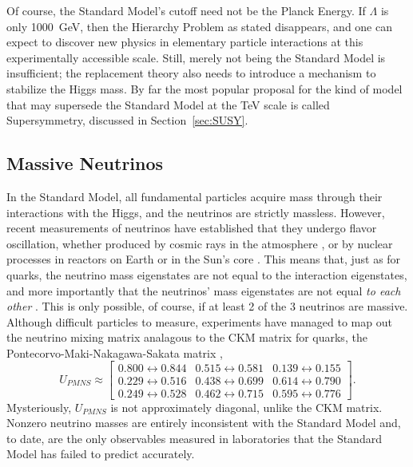   Of course, the Standard Model's cutoff need not be the Planck Energy. 
  If $\Lambda$ is only 1000~GeV, then the Hierarchy Problem as stated disappears, and one can expect to discover new physics in elementary particle interactions at this experimentally accessible scale.
  Still, merely not being the Standard Model is insufficient; the replacement theory also needs to introduce a mechanism to stabilize the Higgs mass.
  By far the most popular proposal for the kind of model that may supersede the Standard Model at the TeV scale is called Supersymmetry, discussed in Section~\ref{sec:SUSY}.

  \subsection{Massive Neutrinos} \label{sec:neutrinomasses}

  In the Standard Model, all fundamental particles acquire mass through their interactions with the Higgs, and the neutrinos are strictly massless.
  However, recent measurements of neutrinos have established that they undergo flavor oscillation, whether produced by cosmic rays in the atmosphere \cite{atmospheric_neutrinos}, or by nuclear processes in reactors on Earth \cite{reactor_neutrinos} or in the Sun's core \cite{solar_neutrinos}.
  This means that, just as for quarks, the neutrino mass eigenstates are not equal to the interaction eigenstates, and more importantly that the neutrinos' mass eigenstates are not equal {\it to each other} \cite{nufit}.
  This is only possible, of course, if at least 2 of the 3 neutrinos are massive.
  Although difficult particles to measure, experiments have managed to map out the neutrino mixing matrix analagous to the CKM matrix for quarks, the Pontecorvo-Maki-Nakagawa-Sakata matrix \cite{pdg},
  \begin{equation}
    U_{PMNS}
\approx
    \begin{bmatrix} 
      0.800 \leftrightarrow 0.844 & 0.515 \leftrightarrow 0.581 & 0.139 \leftrightarrow 0.155 \\
      0.229 \leftrightarrow 0.516 & 0.438 \leftrightarrow 0.699 & 0.614 \leftrightarrow 0.790 \\
      0.249 \leftrightarrow 0.528 & 0.462 \leftrightarrow 0.715 & 0.595 \leftrightarrow 0.776 
    \end{bmatrix}
    .
  \end{equation}
  Mysteriously, $U_{PMNS}$ is not approximately diagonal, unlike the CKM matrix.
  Nonzero neutrino masses are entirely inconsistent with the Standard Model and, to date, are the only observables measured in laboratories that the Standard Model has failed to predict accurately.

